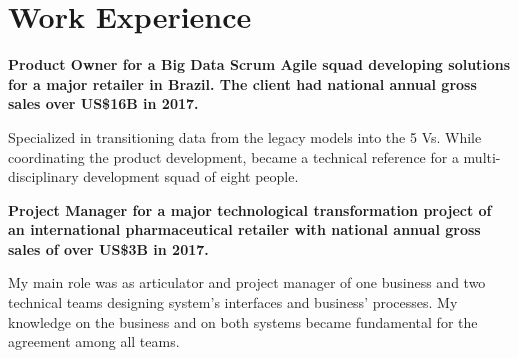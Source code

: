 \documentclass[a4paper]{deedy-resume} %
\begin{document}
\begin{minipage}[t]{0.66\textwidth} %




\section{Work Experience}


\vspace{\topsep} %
\begin{tightitemize}
\item \bf{Product Owner} for a Big Data Scrum Agile squad developing solutions for a major retailer in Brazil. The client had national annual gross sales over US\$16B in 2017.

Specialized in transitioning data from the legacy models into the 5 Vs. While coordinating the product development, became a technical reference for a  multi-disciplinary development squad of eight people.
\item \bf{Project Manager} for a major technological transformation project of an international pharmaceutical retailer with national annual gross sales of over US\$3B in 2017.

My main role was as articulator and project manager of one business and two technical teams designing system's interfaces and business' processes. My knowledge on the business and on both systems became fundamental for the agreement among all teams.


\end{tightitemize}
\end{minipage}
\end{document}
